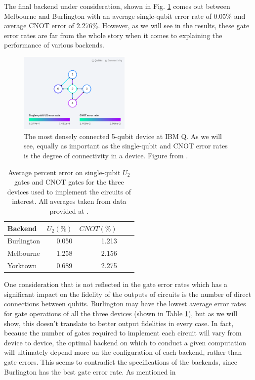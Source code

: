 The final backend under consideration, shown in Fig.
\ref{fig:yorktown_connections} comes out between Melbourne and Burlington with
an average single-qubit error rate of 0.05\% and average CNOT error of 2.276\%.
However, as we will see in the results, these gate error rates are far from the
whole story when it comes to explaining the performance of various backends.
\begin{figure}[h] \centering
\includegraphics[width=0.48\textwidth]{images/connection_diagram_ibmqx2.png}
  \caption{The most densely connected 5-qubit device at IBM Q. As we will see,
equally as important as the single-qubit and CNOT error rates is the degree of
connectivity in a device. Figure from \cite{ibmq_yorktown}.}
  \label{fig:yorktown_connections}
\end{figure}
\newpage
\begin{table} \centering
	\begin{tabular}{lrrrr} \toprule Backend & $U_2 (\%)$ & $CNOT (\%)$ \\ \midrule
		Burlington & 0.050 & 1.213 \\ Melbourne & 1.258 & 2.156 \\ Yorktown & 0.689 &
		2.275 \\ \bottomrule
	\end{tabular}
	\caption{Average percent error on single-qubit $U_2$ gates and CNOT gates for
		the three devices used to implement the circuits of interest. All averages taken
		from data provided at \cite{ibmq_burlington,ibmq_16_melbourne,ibmq_yorktown}.}
	\label{tb:average_errors}
\end{table}
One consideration that is not reflected in the gate error rates which has a
significant impact on the fidelity of the outputs of circuits is the number of
direct connections between qubits. Burlington may have the lowest average error
rates for gate operations of all the three devices (shown in Table
\ref{tb:average_errors}), but as we will show, this doesn't translate to better
output fidelities in every case. In fact, because the number of gates required
to implement each circuit will vary from device to device, the optimal backend
on which to conduct a given computation will ultimately depend more on the
configuration of each backend, rather than gate errors. This seems to contradict the specifications of the backends, since Burlington has the best gate error rate. As mentioned in 

